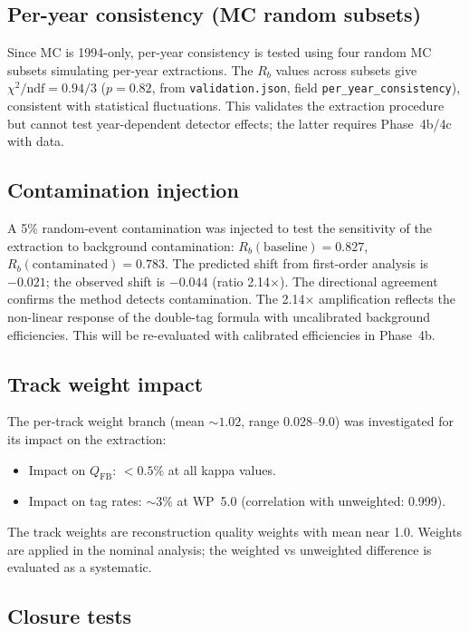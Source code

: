 \documentclass[11pt,a4paper]{article}
\begin{document}
\subsection{Per-year consistency (MC random subsets)}
\label{sec:xcheck_peryear}

Since MC is 1994-only, per-year consistency is tested using four random MC subsets
simulating per-year extractions. The $R_b$ values across subsets give
$\chi^2/\mathrm{ndf} = 0.94/3$ ($p = 0.82$,
from \texttt{validation.json}, field \texttt{per\_year\_consistency}),
consistent with statistical fluctuations. This validates the extraction procedure
but cannot test year-dependent detector effects; the latter requires Phase~4b/4c
with data.

\subsection{Contamination injection}
\label{sec:xcheck_contamination}

A 5\% random-event contamination was injected to test the sensitivity of the
extraction to background contamination:
$R_b(\mathrm{baseline}) = 0.827$,
$R_b(\mathrm{contaminated}) = 0.783$.
The predicted shift from first-order analysis is $-0.021$; the observed shift is $-0.044$
(ratio 2.14$\times$). The directional agreement confirms the method detects contamination.
The 2.14$\times$ amplification reflects the non-linear response of the double-tag formula
with uncalibrated background efficiencies. This will be re-evaluated with calibrated
efficiencies in Phase~4b.

\subsection{Track weight impact}
\label{sec:xcheck_weights}

The per-track weight branch (mean $\sim 1.02$, range 0.028--9.0) was investigated for
its impact on the extraction:
\begin{itemize}
\item Impact on $Q_\mathrm{FB}$: $< 0.5\%$ at all kappa values.
\item Impact on tag rates: $\sim 3\%$ at WP~5.0 (correlation with unweighted: 0.999).
\end{itemize}
The track weights are reconstruction quality weights with mean near 1.0. Weights are
applied in the nominal analysis; the weighted vs unweighted difference is evaluated as
a systematic.

\subsection{Closure tests}
\label{sec:xcheck_closure}
\end{document}
